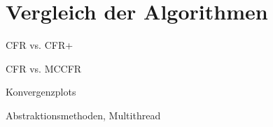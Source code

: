 \section{Vergleich der Algorithmen}
CFR vs. CFR+

CFR vs. MCCFR

Konvergenzplots

Abstraktionsmethoden, Multithread


